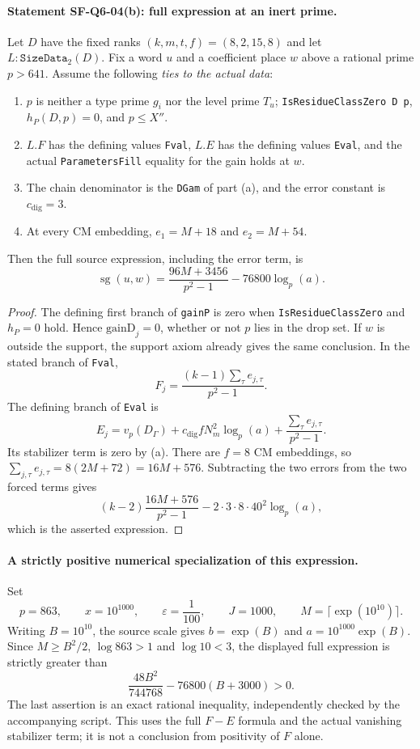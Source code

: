 \paragraph{Statement SF-Q6-04(b): full expression at an inert prime.}
Let $D$ have the fixed ranks $(k,m,t,f)=(8,2,15,8)$ and let
$L:\texttt{SizeData}_2(D)$.  Fix a word $u$ and a coefficient
place $w$ above a rational prime $p>641$.  Assume the following
\emph{ties to the actual data}:
\begin{enumerate}
\item $p$ is neither a type prime $g_i$ nor the level prime $T_u$;
      \texttt{IsResidueClassZero D p}, $h_P(D,p)=0$, and
      $p\le X''$.
\item $L.F$ has the defining values \texttt{Fval}, $L.E$ has the
      defining values \texttt{Eval}, and the actual
      \texttt{ParametersFill} equality for the gain holds at $w$.
\item The chain denominator is the \texttt{DGam} of part (a),
      and the error constant is $c_{\mathrm{dig}}=3$.
\item At every CM embedding,
      $e_1=M+18$ and $e_2=M+54$.
\end{enumerate}
Then the full source expression, including the error term, is
\[
 \boxed{\quad
 \operatorname{sg}(u,w)
   =\frac{96M+3456}{p^2-1}
       -76800\log_p(a).
 \quad}
\]

\begin{proof}
The defining first branch of \texttt{gainP} is zero when
\texttt{IsResidueClassZero} and $h_P=0$ hold.  Hence
$\mathrm{gainD}_j=0$, whether or not $p$ lies in the drop set.
If $w$ is outside the support, the support axiom already gives
the same conclusion.  In the stated branch of \texttt{Fval},
\[
 F_j=\frac{(k-1)\sum_\tau e_{j,\tau}}{p^2-1}.
\]
The defining branch of \texttt{Eval} is
\[
 E_j=v_p(D_\Gamma)
       +c_{\mathrm{dig}}fN_m^2\log_p(a)
       +\frac{\sum_\tau e_{j,\tau}}{p^2-1}.
\]
Its stabilizer term is zero by (a).  There are $f=8$ CM
embeddings, so
$\sum_{j,\tau}e_{j,\tau}=8(2M+72)=16M+576$.
Subtracting the two errors from the two forced terms gives
\[
 (k-2)\frac{16M+576}{p^2-1}
       -2\cdot3\cdot8\cdot40^2\log_p(a),
\]
which is the asserted expression.
\end{proof}

\paragraph{A strictly positive numerical specialization of this expression.}
Set
\[
 p=863,\qquad x=10^{1000},\qquad
 \varepsilon=\frac1{100},\qquad J=1000,\qquad
 M=\lceil\exp(10^{10})\rceil.
\]
Writing $B=10^{10}$, the source scale gives
$b=\exp(B)$ and $a=10^{1000}\exp(B)$.
Since $M\ge B^2/2$, $\log 863>1$ and $\log10<3$, the displayed
full expression is strictly greater than
\[
 \frac{48B^2}{744768}-76800(B+3000)>0.
\]
The last assertion is an exact rational inequality, independently
checked by the accompanying script.  This uses the full
$F-E$ formula and the actual vanishing stabilizer term; it is not
a conclusion from positivity of $F$ alone.


